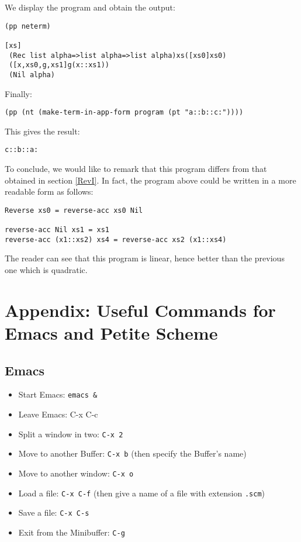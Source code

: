 \documentclass[12pt]{amsart}
\begin{document}

We display the program and obtain the output:
\begin{verbatim}
(pp neterm)

[xs]
 (Rec list alpha=>list alpha=>list alpha)xs([xs0]xs0)
 ([x,xs0,g,xs1]g(x::xs1))
 (Nil alpha)
\end{verbatim}

Finally:
\begin{verbatim}
(pp (nt (make-term-in-app-form program (pt "a::b::c:"))))
\end{verbatim}
This gives the result:
\begin{verbatim}
c::b::a:
\end{verbatim}

To conclude, we would like to remark that this program differs from
that obtained in section \ref{RevI}.  In fact, the program above could
be written in a more readable form as follows:
\begin{verbatim}
Reverse xs0 = reverse-acc xs0 Nil

reverse-acc Nil xs1 = xs1
reverse-acc (x1::xs2) xs4 = reverse-acc xs2 (x1::xs4)
\end{verbatim}
The reader can see that this program is linear, hence better than the
previous one which is quadratic.

\newpage


\section{Appendix: Useful Commands for Emacs and Petite Scheme}

\subsection{Emacs}\label{emacs}
\begin{itemize}
\item Start Emacs: \texttt{emacs \&}\\
\item Leave Emacs: C-x C-c\\
\item Split a window in two: \texttt{C-x 2}\\
\item Move to another Buffer: \texttt{C-x b}
(then specify the Buffer's name)\\
\item Move to another window: \texttt{C-x o}\\
\item Load a file: \texttt{C-x C-f}
(then give a name of a file with extension \texttt{.scm})\\
\item Save a file: \texttt{C-x C-s}\\
\item Exit from the Minibuffer: \texttt{C-g}\\
\end{itemize}
\end{document}
